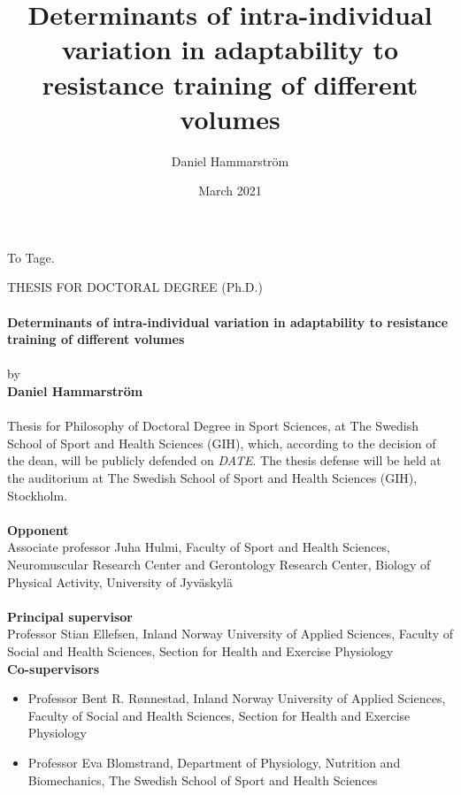 \documentclass[twoside,10pt]{gihclass} %
\title{Determinants of intra-individual variation in adaptability to resistance training of different volumes}
\author{Daniel Hammarström}
\date{March 2021}
\begin{document}


\frontmatter %
  \maketitle
  \begin{dedication}
\vspace*{\fill}
 To Tage.
\vspace*{\fill}
  \end{dedication}
\begin{defence}
    THESIS FOR DOCTORAL DEGREE (Ph.D.)\\
    ~\\
    \textbf{Determinants of intra-individual variation in adaptability to resistance training of different volumes}\\
    ~\\
    by\\
    \textbf{Daniel Hammarström}\\
    ~\\
    Thesis for Philosophy of Doctoral Degree in Sport Sciences, at The Swedish School of Sport and Health Sciences (GIH), which, according to the decision of the dean, will be publicly defended on \emph{DATE}. The thesis defense will be held at the auditorium at The Swedish School of Sport and Health Sciences (GIH), Stockholm.\\
    ~\\
    \textbf{Opponent}\\
    Associate professor Juha Hulmi, Faculty of Sport and Health Sciences, Neuromuscular Research Center and Gerontology Research Center, Biology of Physical Activity, University of Jyväskylä\\
    ~\\
    \textbf{Principal supervisor}\\
    Professor Stian Ellefsen, Inland Norway University of Applied Sciences, Faculty of Social and Health Sciences, Section for Health and Exercise Physiology\\
    \textbf{Co-supervisors}
    \begin{itemize}
    \item
      Professor Bent R. Rønnestad, Inland Norway University of Applied Sciences, Faculty of Social and Health Sciences, Section for Health and Exercise Physiology
    \item
      Professor Eva Blomstrand, Department of Physiology, Nutrition and Biomechanics, The Swedish School of Sport and Health Sciences\\

\end{itemize}
\end{defence}
\end{document}
